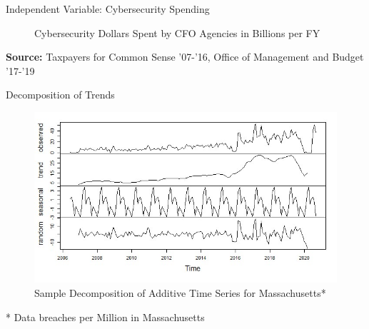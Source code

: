 \documentclass[10pt]{beamer}
\begin{document}
\begin{frame}{Independent Variable: Cybersecurity Spending}
  \begin{figure}
      \caption{Cybersecurity Dollars Spent by CFO Agencies in Billions per FY} \label{fig:figure11}
  \end{figure}
\textbf{Source:} Taxpayers for Common Sense ’07-’16, Office of Management and Budget ’17-’19
\end{frame}

\begin{frame}{Decomposition of Trends}
    \begin{figure}
   \label{fig:decomposition}
   \caption{Sample Decomposition of Additive Time Series for Massachusetts*}
	\includegraphics[width=\textwidth]{Figures/TimeDecomposition.jpg}
    \end{figure}
* Data breaches per Million in Massachusetts
\end{frame}
\end{document}
